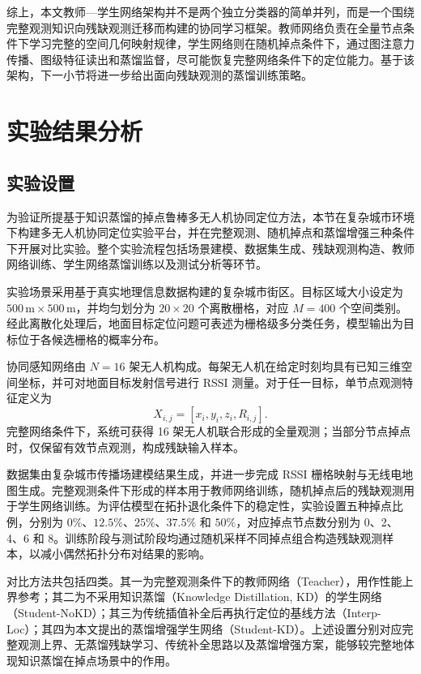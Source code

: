 综上，本文教师—学生网络架构并不是两个独立分类器的简单并列，而是一个围绕完整观测知识向残缺观测迁移而构建的协同学习框架。教师网络负责在全量节点条件下学习完整的空间几何映射规律，学生网络则在随机掉点条件下，通过图注意力传播、图级特征读出和蒸馏监督，尽可能恢复完整网络条件下的定位能力。基于该架构，下一小节将进一步给出面向残缺观测的蒸馏训练策略。

\section{实验结果分析}
\label{sec:4_5}

\subsection{实验设置}
\label{subsec:4_4_1}

为验证所提基于知识蒸馏的掉点鲁棒多无人机协同定位方法，本节在复杂城市环境下构建多无人机协同定位实验平台，并在完整观测、随机掉点和蒸馏增强三种条件下开展对比实验。整个实验流程包括场景建模、数据集生成、残缺观测构造、教师网络训练、学生网络蒸馏训练以及测试分析等环节。

实验场景采用基于真实地理信息数据构建的复杂城市街区。目标区域大小设定为 \(500\,\mathrm{m}\times 500\,\mathrm{m}\)，并均匀划分为 \(20\times 20\) 个离散栅格，对应 \(M=400\) 个空间类别。经此离散化处理后，地面目标定位问题可表述为栅格级多分类任务，模型输出为目标位于各候选栅格的概率分布。

协同感知网络由 \(N=16\) 架无人机构成。每架无人机在给定时刻均具有已知三维空间坐标，并可对地面目标发射信号进行 RSSI 测量。对于任一目标，单节点观测特征定义为
\begin{equation}
X_{i,j}=[x_i,y_i,z_i,R_{i,j}].
\end{equation}
完整网络条件下，系统可获得 16 架无人机联合形成的全量观测；当部分节点掉点时，仅保留有效节点观测，构成残缺输入样本。

数据集由复杂城市传播场建模结果生成，并进一步完成 RSSI 栅格映射与无线电地图生成。完整观测条件下形成的样本用于教师网络训练，随机掉点后的残缺观测用于学生网络训练。为评估模型在拓扑退化条件下的稳定性，实验设置五种掉点比例，分别为 \(0\%\)、\(12.5\%\)、\(25\%\)、\(37.5\%\) 和 \(50\%\)，对应掉点节点数分别为 0、2、4、6 和 8。训练阶段与测试阶段均通过随机采样不同掉点组合构造残缺观测样本，以减小偶然拓扑分布对结果的影响。

对比方法共包括四类。其一为完整观测条件下的教师网络（Teacher），用作性能上界参考；其二为不采用知识蒸馏（Knowledge Distillation, KD）的学生网络（Student-NoKD）；其三为传统插值补全后再执行定位的基线方法（Interp-Loc）；其四为本文提出的蒸馏增强学生网络（Student-KD）。上述设置分别对应完整观测上界、无蒸馏残缺学习、传统补全思路以及蒸馏增强方案，能够较完整地体现知识蒸馏在掉点场景中的作用。

